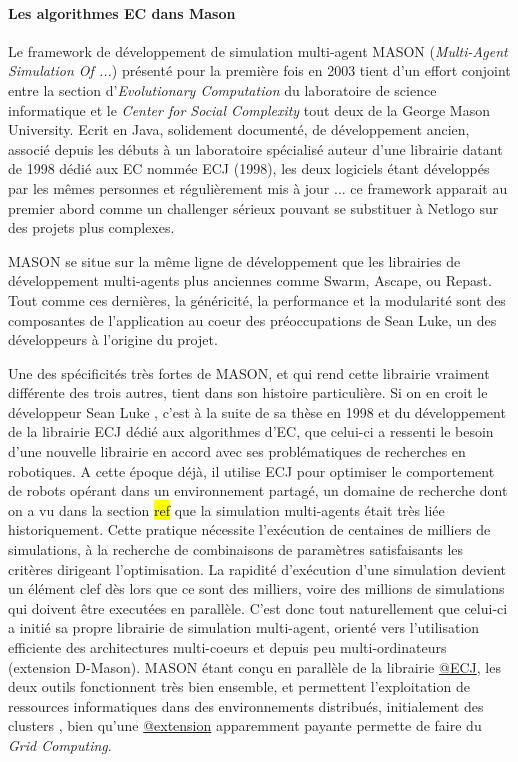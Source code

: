 \paragraph{Les algorithmes EC dans Mason}

Le framework de développement de simulation multi-agent MASON (\textit{Multi-Agent Simulation Of ...}) présenté pour la première fois en 2003 tient d'un effort conjoint entre la section d'\textit{Evolutionary Computation} du laboratoire de science informatique et le \textit{Center for Social Complexity} tout deux de la George Mason University. Ecrit en Java, solidement documenté, de développement ancien, associé depuis les débuts à un laboratoire spécialisé auteur d'une librairie datant de 1998 dédié aux EC nommée ECJ (1998), les deux logiciels étant développés par les mêmes personnes et régulièrement mis à jour ... ce framework apparait au premier abord comme un challenger sérieux pouvant se substituer à Netlogo sur des projets plus complexes. 

MASON se situe sur la même ligne de développement que les librairies de développement multi-agents plus anciennes comme Swarm, Ascape, ou Repast. Tout comme ces dernières, la généricité, la performance et la modularité sont des composantes de l'application au coeur des préoccupations de Sean Luke, un des développeurs à l'origine du projet. 

Une des spécificités très fortes de MASON, et qui rend cette librairie vraiment différente des trois autres, tient dans son histoire particulière. Si on en croit le développeur Sean Luke , c'est à la suite de sa thèse en 1998 et du développement de la librairie ECJ  dédié aux algorithmes d'EC, que celui-ci a ressenti le besoin d'une nouvelle librairie en accord avec ses problématiques de recherches en robotiques. A cette époque déjà, il utilise ECJ pour optimiser le comportement de robots opérant dans un environnement partagé, un domaine de recherche dont on a vu dans la section \hl{ref} que la simulation multi-agents était très liée historiquement. Cette pratique nécessite l'exécution de centaines de milliers de simulations, à la recherche de combinaisons de paramètres satisfaisants les critères dirigeant l'optimisation. La rapidité d'exécution d'une simulation devient un élément clef dès lors que ce sont des milliers, voire des millions de simulations qui doivent être executées en parallèle. C'est donc tout naturellement que celui-ci a initié sa propre librairie de simulation multi-agent, orienté vers l'utilisation efficiente des architectures multi-coeurs et depuis peu multi-ordinateurs (extension D-Mason). MASON étant conçu en parallèle de la librairie \href{http://cs.gmu.edu/~eclab/projects/ecj/}{@ECJ}, les deux outils fonctionnent très bien ensemble, et permettent l'exploitation de ressources informatiques dans des environnements distribués, initialement des clusters \autocite[211]{Luke2014}, bien qu'une \href{http://www.parabon.com/dev-center/origin}{@extension} apparemment payante permette de faire du \textit{Grid Computing}.

